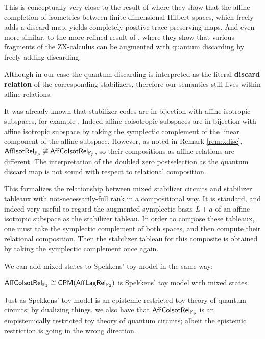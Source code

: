 This is conceptually very close to the result of \cite{huot} where they show that the affine completion of isometries between finite dimensional Hilbert spaces, which freely adds a discard map, yields completely positive trace-preserving maps.  And even more similar, to the more refined result of   \cite{disc}, where they show that various fragments of the ZX-calculus can be augmented with quantum discarding by freely adding discarding. 

Although in our case the quantum discarding is interpreted as the literal {\bf discard relation} of the corresponding stabilizers, therefore our semantics still lives within affine relations.








It was already known that stabilizer codes are in bijection with  affine isotropic subspaces, for example \cite[\S A]{gross}.  Indeed affine coisotropic subspaces are in bijection with affine isotropic subspace by  taking the symplectic complement of the linear component of the affine subspace. However, as noted in Remark  \ref{rem:xdisc}, $\mathsf{Aff}{\sf Isot}\mathsf{Rel}_{\mathbb{F}_p} \not \cong \mathsf{Aff}{\sf Co}{\sf Isot}\mathsf{Rel}_{\mathbb{F}_p}$, so their compositions as affine relations are different. The interpretation of the doubled zero postselection as the quantum discard map is not sound with respect to relational composition.   


This formalizes the relationship between mixed stabilizer circuits and stabilizer tableaux with not-necessarily-full rank in  a compositional way.  It is standard, and indeed very useful to regard the augmented symplectic basis $L+a$ of an affine isotropic subspace as the stabilizer tableau.  In order to compose these tableaux, one must take the symplectic complement of both spaces, and then compute  their relational composition.  Then the stabilizer tableau for this composite is obtained by taking the symplectic complement once again.



We can add mixed states to Spekkens' toy model in the same way:

\begin{corollary}
$\mathsf{Aff}{\sf Co}{\sf Isot}\mathsf{Rel}_{\mathbb{F}_2}\cong \mathsf{CPM}(\mathsf{Aff}\mathsf{Lag}\mathsf{Rel}_{\mathbb{F}_2})$ is Spekkens' toy model with mixed states.
\end{corollary}

Just as Spekkens' toy model is an epistemic restricted toy theory of quantum circuits; by dualizing things, we also have that $\mathsf{Aff}{\sf Co}{\sf Isot}\mathsf{Rel}_{\mathbb{F}_p}$ is an empistemically restricted toy theory of quantum circuits; albeit the epistemic restriction is going in the wrong direction.


